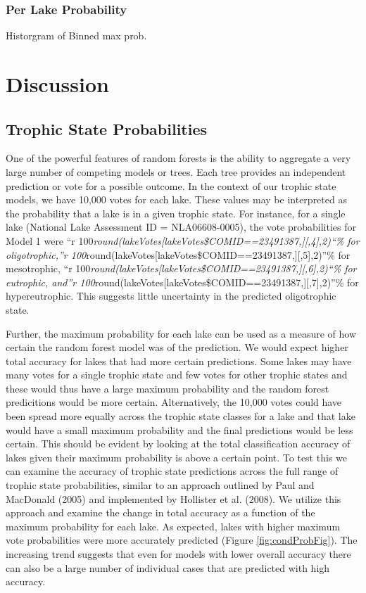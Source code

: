 \documentclass[11pt,]{article}
\begin{document}
\subsubsection{Per Lake Probability}\label{per-lake-probability-1}

Historgram of Binned max prob.

\section{Discussion}\label{discussion}

\subsection{Trophic State
Probabilities}\label{trophic-state-probabilities}

One of the powerful features of random forests is the ability to
aggregate a very large number of competing models or trees. Each tree
provides an independent prediction or vote for a possible outcome. In
the context of our trophic state models, we have 10,000 votes for each
lake. These values may be interpreted as the probability that a lake is
in a given trophic state. For instance, for a single lake (National Lake
Assessment ID = NLA06608-0005), the vote probabilities for Model 1 were
``r
100\emph{round(lakeVotes{[}lakeVotes\$COMID==23491387,{]}{[},4{]},2)``\%
for oligotrophic,''r
100}round(lakeVotes{[}lakeVotes\$COMID==23491387,{]}{[},5{]},2)''\% for
mesotrophic, ``r
100\emph{round(lakeVotes{[}lakeVotes\$COMID==23491387,{]}{[},6{]},2)``\%
for eutrophic, and''r
100}round(lakeVotes{[}lakeVotes\$COMID==23491387,{]}{[},7{]},2)''\% for
hypereutrophic. This suggests little uncertainty in the predicted
oligotrophic state.

Further, the maximum probability for each lake can be used as a measure
of how certain the random forest model was of the prediction. We would
expect higher total accuracy for lakes that had more certain
predictions. Some lakes may have many votes for a single trophic state
and few votes for other trophic states and these would thus have a large
maximum probability and the random forest predicitions would be more
certain. Alternatively, the 10,000 votes could have been spread more
equally across the trophic state classes for a lake and that lake would
have a small maximum probability and the final predictions would be less
certain. This should be evident by looking at the total classification
accuracy of lakes given their maximum probability is above a certain
point. To test this we can examine the accuracy of trophic state
predictions across the full range of trophic state probabilities,
similar to an approach outlined by Paul and MacDonald (2005) and
implemented by Hollister et al. (2008). We utilize this approach and
examine the change in total accuracy as a function of the maximum
probability for each lake. As expected, lakes with higher maximum vote
probabilities were more accurately predicted (Figure
\ref{fig:condProbFig}). The increasing trend suggests that even for
models with lower overall accuracy there can also be a large number of
individual cases that are predicted with high accuracy.
\end{document}
